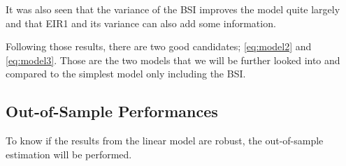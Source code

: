 \documentclass[12pt,a4paper,oneside]{book}
\begin{document}
It was also seen that the variance of the BSI improves the model quite largely and that EIR1 and its variance can also add some information.


Following those results, there are two good candidates; \autoref{eq:model2} and \ref{eq:model3}. Those are the two models that we will be further looked into and compared to the simplest model only including the BSI.



\subsection{Out-of-Sample Performances}

To know if the results from the linear model are robust, the out-of-sample estimation will be performed.


\newpage
\end{document}
